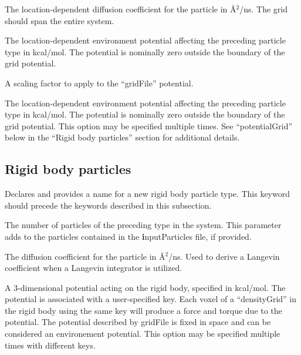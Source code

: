 \documentclass[10pt]{article}
\begin{document}
{The location-dependent diffusion coefficient for the particle in \AA$^2$/ns. The grid should span the entire system.}

{The location-dependent environment potential affecting the preceding particle type in kcal/mol. The potential is nominally zero outside the boundary of the grid potential.}

{A scaling factor to apply to the ``gridFile'' potential.}

{The location-dependent environment potential affecting the preceding particle type in kcal/mol. The potential is nominally zero outside the boundary of the grid potential.
This option may be specified multiple times. See ``potentialGrid'' below  in the ``Rigid body particles'' section for additional details.
}



\subsection{Rigid body particles}

{Declares and provides a name for a new rigid body particle type. This keyword should precede the keywords described in this subsection.}

{The number of particles of the preceding type in the system. This parameter adds to the particles contained in the {\textbf inputParticles} file, if provided.}

{The diffusion coefficient for the particle in \AA$^2$/ns. Used to derive a Langevin coefficient when a Langevin integrator is utilized.}


{A 3-dimensional potential acting on the rigid body, specified in kcal/mol.
The potential is associated with a user-specified key.
Each voxel of a ``densityGrid'' in the rigid body using the same key will produce a force and torque due to the potential.
The potential described by gridFile is fixed in space and can be considered an environement potential. 
This option may be specified multiple times with different keys.
}
\end{document}
